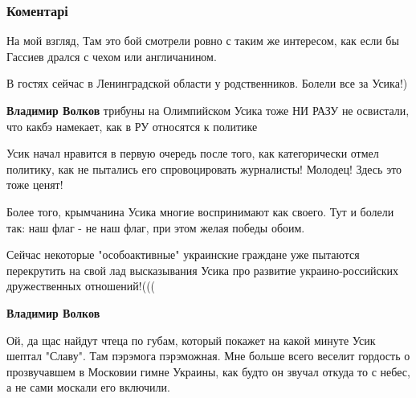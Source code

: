  
 
 
 
 
\subsubsection{Коментарі}

\begin{itemize} %
На мой взгляд, Там это бой смотрели ровно с таким же интересом, как если бы Гассиев дрался с чехом или англичанином.

\begin{itemize} %
В гостях сейчас в Ленинградской области у родственников. Болели все за Усика!)

\textbf{Владимир Волков} трибуны на Олимпийском Усика тоже НИ РАЗУ не освистали, что какбэ намекает, как в РУ относятся к политике


Усик начал нравится в первую очередь после того, как категорически отмел
политику, как не пытались его спровоцировать журналисты!
Молодец! Здесь это тоже ценят!

Более того, крымчанина Усика многие воспринимают как своего. Тут и болели так: наш флаг - не наш флаг, при этом желая победы обоим.


Сейчас некоторые "особоактивные" украинские граждане уже пытаются перекрутить
на свой лад высказывания Усика про развитие украино-российских дружественных
отношений!(((


\textbf{Владимир Волков} 

Ой, да щас найдут чтеца по губам, который покажет на какой минуте Усик шептал
"Славу". Там пэрэмога пэрэможная. Мне больше всего веселит гордость о
прозвучавшем в Московии гимне Украины, как будто он звучал откуда то с небес, а
не сами москали его включили.

\end{itemize} %

\end{itemize} %
